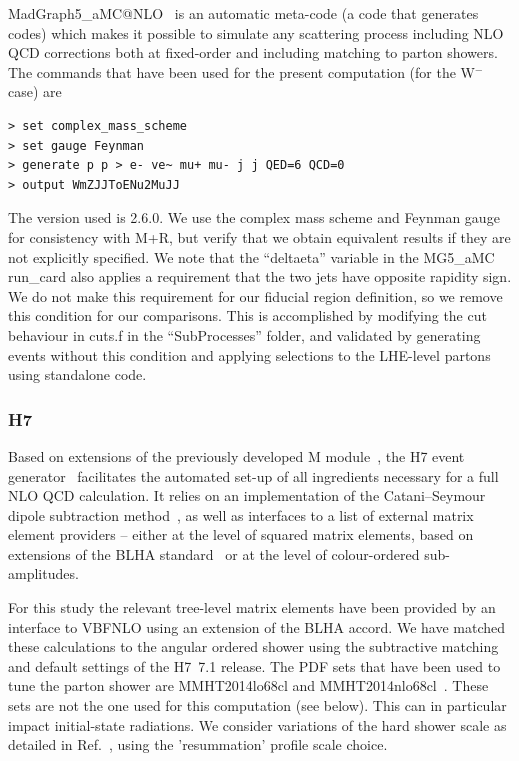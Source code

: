 \documentclass[11pt]{cernrep}
\newcommand{\Herwig}{H\protect\scalebox{0.8}{ERWIG}7\xspace}
\newcommand{\Matchbox}{M\protect\scalebox{0.8}{ATCHBOX}\xspace}
\newcommand{\MoCaNLO}{M\protect\scalebox{0.8}{oCaNLO}\xspace}
\newcommand{\Recola}{R\protect\scalebox{0.8}{ecola}\xspace}
\begin{document}
{\sc MadGraph5\_aMC@NLO}~\cite{Alwall:2014hca} is an automatic meta-code (a code that generates codes) which makes it possible to simulate any scattering process
      including NLO QCD corrections both at fixed-order and including matching to parton showers. 
      The commands that have been used for the present computation (for the W$^{-}$ case) are 
\begin{verbatim}
> set complex_mass_scheme
> set gauge Feynman
> generate p p > e- ve~ mu+ mu- j j QED=6 QCD=0
> output WmZJJToENu2MuJJ
\end{verbatim}
  The version used is 2.6.0. We use the complex mass scheme and Feynman gauge for consistency with \MoCaNLO+\Recola, but 
  verify that we obtain equivalent results if they are not explicitly specified.
  We note that the ``deltaeta'' variable in the MG5\_aMC run\_card also applies a requirement that the two jets
  have opposite rapidity sign. We do not make this requirement for our fiducial region definition, so we remove this condition for our comparisons.
  This is accomplished by modifying the cut behaviour in cuts.f in the ``SubProcesses'' folder, and validated by
  generating events without this condition and applying selections to the LHE-level partons using standalone code.
  
\subsubsection*{\protect\Herwig \label{vbs_herwig}}

Based on extensions of the previously developed \Matchbox
module~\cite{Platzer:2011bc}, the \Herwig event generator~\cite{Bellm:2015jjp,Bahr:2008pv} facilitates the automated set-up of all ingredients necessary for a full NLO QCD calculation.
It relies on an implementation of the Catani--Seymour dipole
subtraction method~\cite{Catani:1996vz,Catani:2002hc}, as well as
interfaces to a list of external matrix element providers -- either
at the level of squared matrix elements, based on extensions of the
BLHA standard~\cite{Binoth:2010xt,Alioli:2013nda,Andersen:2014efa} or
at the level of colour-ordered sub-amplitudes.

For this study the relevant tree-level matrix elements have been
provided by an interface to VBFNLO \cite{Arnold:2008rz,Arnold:2011wj,Baglio:2014uba} using an extension of the BLHA
accord. We have matched these calculations to the angular ordered
shower using the subtractive matching and default settings of the
\Herwig~7.1 release. The PDF sets that have been used to tune the parton shower are MMHT2014lo68cl and
MMHT2014nlo68cl~\cite{Harland-Lang:2014zoa}.
These sets are not the one used for this computation (see below).
This can in particular impact initial-state radiations.
We consider variations of the hard shower scale as detailed in Ref.~\cite{Bellm:2016rhh}, using the 'resummation' profile scale choice.
\end{document}

